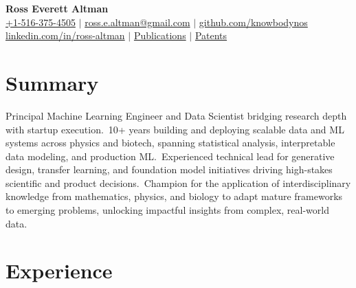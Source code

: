 \documentclass[10pt,a4paper]{article}
\begin{document}
\begin{center}
    {\LARGE \textbf{Ross Everett Altman}}\\[4pt]
    \footnotesize
    \href{tel:+1-516-375-4505}{\faMobile\space +1-516-375-4505} $|$
    \href{mailto:ross.e.altman@gmail.com}{\faEnvelope\space ross.e.altman@gmail.com} $|$
    \href{https://github.com/knowbodynos}{\faGithub\space github.com/knowbodynos} \\
    \href{https://www.linkedin.com/in/ross-altman}{\faLinkedin\space linkedin.com/in/ross-altman} $|$
    \href{https://bit.ly/ross-altman-publications}{\faGraduationCap\space Publications} $|$
    \href{https://bit.ly/ross-altman-patents}{\faCopyright\space Patents}
\end{center}

\section*{Summary \hrulefill}
Principal Machine Learning Engineer and Data Scientist bridging research depth with startup execution.\ 
10+ years building and deploying scalable data and ML systems across physics and biotech, spanning statistical analysis, interpretable data modeling, and production ML.\ 
Experienced technical lead for generative design, transfer learning, and foundation model initiatives driving high-stakes scientific and product decisions.\ 
Champion for the application of interdisciplinary knowledge from mathematics, physics, and biology to adapt mature frameworks to emerging problems, unlocking impactful insights from complex, real-world data.\ 


\section*{Experience \hrulefill}
\end{document}
